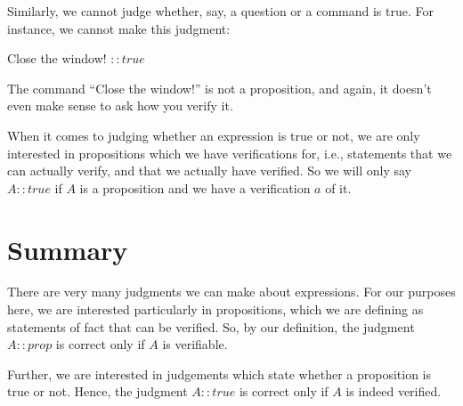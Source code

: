 \documentclass[../../../main.tex]{subfiles}
\begin{document}
Similarly, we cannot judge whether, say, a question or a command is true. For instance, we cannot make this judgment:

\begin{center}
  Close the window! $:: true$
\end{center}

\noindent
The command ``Close the window!'' is not a proposition, and again, it doesn't even make sense to ask how you verify it.

When it comes to judging whether an expression is true or not, we are only interested in propositions which we have verifications for, i.e., statements that we can actually verify, and that we actually have verified. So we will only say $A :: true$ if $A$ is a proposition and we have a verification $a$ of it.


\section{Summary}

There are very many judgments we can make about expressions. For our purposes here, we are interested particularly in propositions, which we are defining as statements of fact that can be  verified. So, by our definition, the judgment $A :: prop$ is correct only if $A$ is verifiable. 

Further, we are interested in judgements which state whether a proposition is true or not. Hence, the judgment $A :: true$ is correct only if $A$ is indeed verified.
\end{document}
